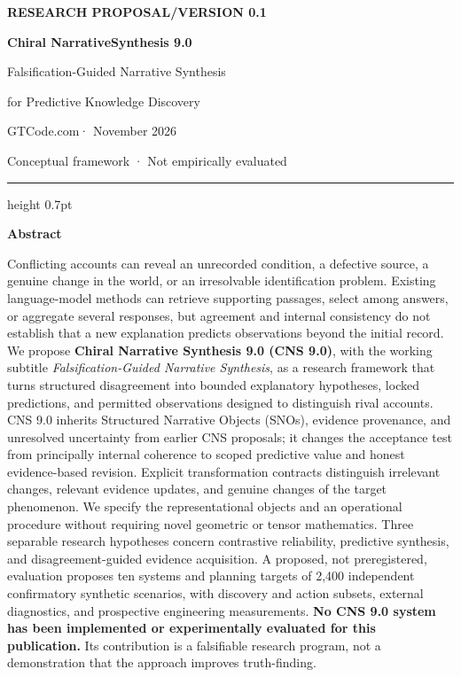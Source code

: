 \documentclass[11pt,a4paper]{article}
\renewenvironment{abstract}{%
  \par\vspace{1.1em}%
  {\sffamily\bfseries\color{CNSInk} Abstract\par}%
  \vspace{0.35em}\small\setlength{\parindent}{0pt}\noindent\ignorespaces
}{\par\vspace{0.9em}\normalsize}
\begin{document}
\thispagestyle{opening}
\begingroup
\raggedright
{\small\sffamily\bfseries\color{CNSBlue} RESEARCH PROPOSAL\enspace /\enspace VERSION 0.1\par}
\vspace{1em}
{\fontsize{27}{31}\selectfont\bfseries Chiral Narrative\newline Synthesis 9.0\par}
\vspace{0.55em}
{\Large Falsification-Guided Narrative Synthesis\par}
\vspace{0.18em}
{\large for Predictive Knowledge Discovery\par}
\vspace{0.9em}
{\normalsize\sffamily GTCode.com\enspace · November 2026\par}
\vspace{0.55em}
{\small\sffamily\color{CNSMuted} Conceptual framework · Not empirically evaluated\par}
\endgroup
\vspace{0.8em}
{\color{CNSBlue}\hrule height 0.7pt}
\begin{abstract}
Conflicting accounts can reveal an unrecorded condition, a defective
source, a genuine change in the world, or an irresolvable identification
problem. Existing language-model methods can retrieve supporting
passages, select among answers, or aggregate several responses, but
agreement and internal consistency do not establish that a new
explanation predicts observations beyond the initial record. We propose
\textbf{Chiral Narrative Synthesis 9.0 (CNS 9.0)}, with the working
subtitle \emph{Falsification-Guided Narrative Synthesis}, as a research
framework that turns structured disagreement into bounded explanatory
hypotheses, locked predictions, and permitted observations designed to
distinguish rival accounts. CNS 9.0 inherits Structured Narrative
Objects (SNOs), evidence provenance, and unresolved uncertainty from
earlier CNS proposals; it changes the acceptance test from principally
internal coherence to scoped predictive value and honest evidence-based
revision. Explicit transformation contracts distinguish irrelevant
changes, relevant evidence updates, and genuine changes of the target
phenomenon. We specify the representational objects and an operational
procedure without requiring novel geometric or tensor mathematics. Three
separable research hypotheses concern contrastive reliability,
predictive synthesis, and disagreement-guided evidence acquisition. A
proposed, not preregistered, evaluation proposes ten systems and
planning targets of 2,400 independent confirmatory synthetic scenarios,
with discovery and action subsets, external diagnostics, and prospective
engineering measurements. \textbf{No CNS 9.0 system has been implemented
or experimentally evaluated for this publication.} Its contribution is a
falsifiable research program, not a demonstration that the approach
improves truth-finding.
\end{abstract}
\end{document}
